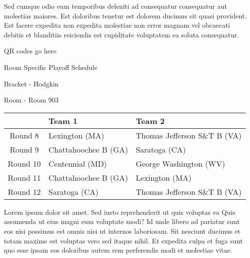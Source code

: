 \documentclass{article}%
\begin{document}
\newline%
Sed cumque odio eum temporibus deleniti ad consequatur consequatur aut molestias maiores. Est doloribus tenetur est dolorem ducimus sit quasi provident. Est facere expedita non expedita molestiae non error magnam vel obcaecati debitis et blanditiis reiciendis est cupiditate voluptatem ea soluta consequatur.%
\vspace*{140pt}%
\begin{center}%
\begin{Huge}%
QR codes go here%
\end{Huge}%
\end{center}%
\newpage%
\begin{center}%
\begin{Huge}%
Room Specific Playoff Schedule%
\end{Huge}%
\vspace*{8pt}%
\linebreak%
\begin{Large}%
Bracket {-} Hodgkin%
\end{Large}%
\vspace*{8pt}%
\linebreak%
\vspace*{8pt}%
\begin{Large}%
Room {-} Room 903%
\end{Large}%
\end{center}%
%
\begin{tabularx}{\textwidth}{|c|Y|Y|}%
\hline%
&Team 1&Team 2\\%
\hline%
Round 8&Lexington (MA)&Thomas Jefferson S\&T B (VA)\\%
Round 9&Chattahoochee B (GA)&Saratoga (CA)\\%
Round 10&Centennial (MD)&George Washington (WV)\\%
Round 11&Chattahoochee B (GA)&Lexington (MA)\\%
Round 12&Saratoga (CA)&Thomas Jefferson S\&T B (VA)\\%
\hline%
\end{tabularx}%
\vspace*{8pt}%
\newline%
Lorem ipsum dolor sit amet. Sed iusto reprehenderit ut quis voluptas ea Quis assumenda ut eius magni eum voluptate modi? Id unde libero ad pariatur sunt eos nisi possimus est omnis nisi ut internos laboriosam. Sit nesciunt ducimus et totam maxime est voluptas vero sed itaque nihil. Et expedita culpa et fuga sunt quo esse ipsam eos doloribus autem rem perferendis modi et molestiae vitae.\newline%
\end{document}
